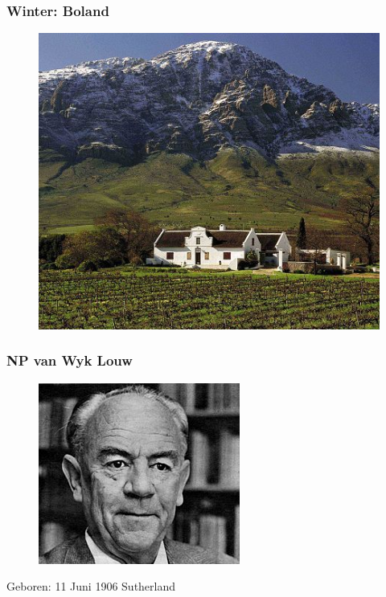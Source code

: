 \documentclass[8pt]{beamer}
\begin{document}
\begin{frame}
	\frametitle{Winter: Boland}
	\begin{figure}[H]
		\includegraphics[scale=0.6]{wynland}
	\end{figure}
\end{frame}


\begin{frame}
	\frametitle{NP van Wyk Louw}
	\begin{figure}[H]
		\includegraphics[scale=0.6]{npvwlouw}
	\end{figure}
	\center
	Geboren: 11 Juni 1906
	Sutherland
\end{frame}
\end{document}

